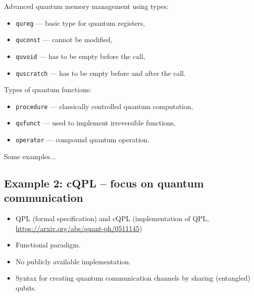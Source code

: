 \documentclass[a4paper,11pt]{article}
\begin{document}

Advanced quantum memory management using types:
\begin{itemize}
\item \texttt{qureg} ---  basic type for quantum registers,
\item \texttt{quconst} --- cannot be modified,
\item \texttt{quvoid} --- has to be empty before the call,
\item \texttt{quscratch} --- has to be empty before and after the 
call.
\end{itemize}

Types of quantum functions:
\begin{itemize}
\item \texttt{procedure} ---  classically controlled quantum 
computation,
\item \texttt{qufunct} --- used to implement irreversible functions,
\item \texttt{operator} --- compound quantum operation.
\end{itemize}



Some examples...


\subsection{Example 2: cQPL -- focus on quantum communication}



\begin{itemize}
\item QPL (formal specification) and cQPL (implementation of QPL, 
\url{https://arxiv.org/abs/quant-ph/0511145})
\item Functional paradigm.
\item No publicly available implementation.
\item Syntax for creating quantum communication channels by sharing 
(entangled) qubits.
\end{itemize}
\end{document}
